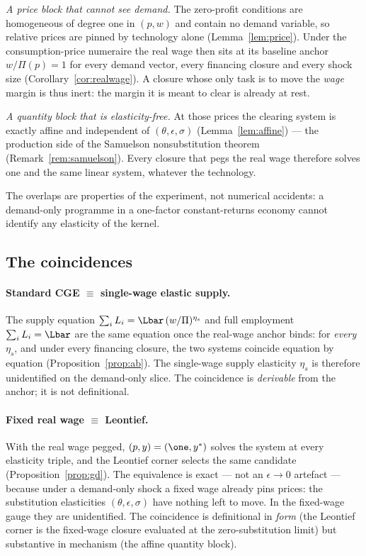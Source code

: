 \emph{A price block that cannot see demand.} The zero-profit conditions are
homogeneous of degree one in $(p,w)$ and contain no demand variable, so
relative prices are pinned by technology alone (Lemma~\ref{lem:price}).
Under the consumption-price numeraire the real wage then sits at its
baseline anchor $w/\Pi(p)=1$ for every demand vector, every financing
closure and every shock size (Corollary~\ref{cor:realwage}). A closure
whose only task is to move the \emph{wage} margin is thus inert: the margin
it is meant to clear is already at rest.

\emph{A quantity block that is elasticity-free.} At those prices the
clearing system is exactly affine and independent of $(\theta,\epsilon,
\sigma)$ (Lemma~\ref{lem:affine}) --- the production side of the Samuelson
nonsubstitution theorem (Remark~\ref{rem:samuelson}). Every closure that
pegs the real wage therefore solves one and the same linear system,
whatever the technology.

The overlaps are properties of the experiment, not numerical accidents: a
demand-only programme in a one-factor constant-returns economy cannot
identify any elasticity of the kernel.

\subsection{The coincidences}\label{app:eqpairs}

\paragraph{Standard CGE $\equiv$ single-wage elastic supply.}
The supply equation $\sum_i L_i=\Lbar\,(w/\Pi)^{\eta_s}$ and full
employment $\sum_i L_i=\Lbar$ are the same equation once the real-wage
anchor binds: for \emph{every} $\eta_s$, and under every financing closure,
the two systems coincide equation by equation (Proposition~\ref{prop:ab}).
The single-wage supply elasticity $\eta_s$ is therefore unidentified on the
demand-only slice. The coincidence is \emph{derivable} from the anchor; it
is not definitional.

\paragraph{Fixed real wage $\equiv$ Leontief.}
With the real wage pegged, $(p,y)=(\one,y^{\ast})$ solves the system at
every elasticity triple, and the Leontief corner selects the same candidate
(Proposition~\ref{prop:gd}). The equivalence is exact --- not an
$\epsilon\to0$ artefact --- because under a demand-only shock a fixed wage
already pins prices: the substitution elasticities $(\theta,\epsilon,
\sigma)$ have nothing left to move. In the fixed-wage gauge they are
unidentified. The coincidence is definitional in \emph{form} (the Leontief
corner is the fixed-wage closure evaluated at the zero-substitution limit)
but substantive in mechanism (the affine quantity block).

